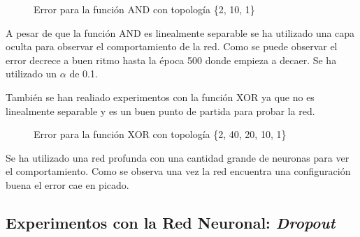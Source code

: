 \begin{figure}[H]
    \centering
    
    
    \caption{Error para la función AND con topología \{2, 10, 1\}} 
    \label{fig:NetAndExperiment}
\end{figure}

A pesar de que la función AND es linealmente separable se ha utilizado una capa oculta para observar el comportamiento de la red. Como se puede observar el error decrece a buen ritmo hasta la época 500 donde empieza a decaer. Se ha utilizado un $\alpha$ de 0.1.

También se han realiado experimentos con la función XOR ya que no es linealmente separable y es un buen punto de partida para probar la red.

\begin{figure}[H]
    \centering
    
    
    \caption{Error para la función XOR con topología \{2, 40, 20, 10, 1\}} 
    \label{fig:NetXorExperiment}
\end{figure}

Se ha utilizado una red profunda con una cantidad grande de neuronas para ver el comportamiento. Como se observa una vez la red encuentra una configuración buena el error cae en picado.

\newpage
\subsection{Experimentos con la Red Neuronal: \textit{Dropout}}
\label{subsubsec:nnexperiments:Dropout}

